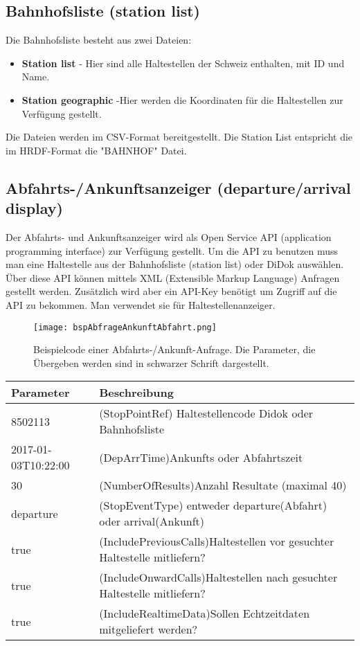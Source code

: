 \subsection{Bahnhofsliste (station list)}
\label{Bahnhofsliste}
Die Bahnhofsliste besteht aus zwei Dateien:
\begin{itemize}
	\item{\textbf{Station list}} - Hier sind alle Haltestellen der Schweiz enthalten, mit ID und Name.   
	\item{\textbf{Station geographic}} -Hier werden die Koordinaten für die Haltestellen zur Verfügung gestellt.
\end{itemize}
Die Dateien werden im CSV-Format bereitgestellt.
Die Station List entspricht die im HRDF-Format die "BAHNHOF"  Datei.\cite{bahnhofsliste}

\subsection{Abfahrts-/Ankunftsanzeiger (departure/arrival display)}%
\label{sec:Abfahrts-/Ankunftsanzeiger}
Der Abfahrts- und Ankunftsanzeiger wird als Open Service API (application programming interface) zur Verfügung gestellt. Um die API zu benutzen muss man eine Haltestelle aus der Bahnhofsliste (station list) oder DiDok auswählen. Über diese API können mittels XML (Extensible Markup Language) Anfragen gestellt werden. Zusätzlich wird aber ein API-Key benötigt um Zugriff auf die API zu bekommen. Man verwendet sie für Haltestellenanzeiger. \cite{abfahrts-ankunftsanzeige}

\begin{figure}[]
	\centering
	\texttt{[image: bspAbfrageAnkunftAbfahrt.png]}
	\caption{Beispielcode einer Abfahrts-/Ankunft-Anfrage. Die Parameter, die Übergeben werden sind in schwarzer Schrift dargestellt.\cite{abfahrts-ankunftsanzeige}}
	\label{fig:Beispiel Anfrage Abfahrts-/Ankunftsanzeiger}
\end{figure}
\begin{tabular}{|l|l|}  \hline
	Parameter & Beschreibung \\ \hline
	8502113 & (StopPointRef) Haltestellencode Didok oder Bahnhofsliste   \\ \hline
	2017-01-03T10:22:00 & (DepArrTime)Ankunfts oder Abfahrtszeit \\ \hline
	30 & (NumberOfResults)Anzahl Resultate (maximal 40) \\ \hline
	departure & (StopEventType) entweder departure(Abfahrt) oder arrival(Ankunft) \\ \hline
	true & (IncludePreviousCalls)Haltestellen vor gesuchter Haltestelle mitliefern? \\ \hline	
	true & (IncludeOnwardCalls)Haltestellen nach gesuchter Haltestelle mitliefern? \\ \hline
	true & (IncludeRealtimeData)Sollen Echtzeitdaten mitgeliefert werden? \\ \hline
\end{tabular}

